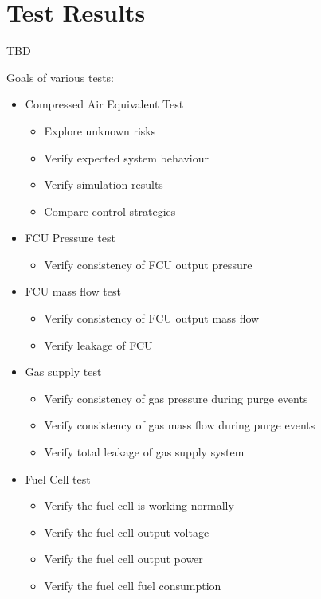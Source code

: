 \chapter{Test Results}%
\label{chap:testing}
TBD
\newpage




Goals of various tests:
\begin{itemize}
    \item Compressed Air Equivalent Test
          \begin{itemize}
              \item Explore unknown risks
              \item Verify expected system behaviour
              \item Verify simulation results
              \item Compare control strategies
          \end{itemize}

    \item FCU Pressure test
          \begin{itemize}
              \item Verify consistency of FCU output pressure
          \end{itemize}

    \item FCU mass flow test
          \begin{itemize}
              \item Verify consistency of FCU output mass flow
              \item Verify leakage of FCU
          \end{itemize}

    \item Gas supply test
          \begin{itemize}
              \item Verify consistency of gas pressure during purge events
              \item Verify consistency of gas mass flow during purge events
              \item Verify total leakage of gas supply system
          \end{itemize}

    \item Fuel Cell test
          \begin{itemize}
              \item Verify the fuel cell is working normally
              \item Verify the fuel cell output voltage
              \item Verify the fuel cell output power
              \item Verify the fuel cell fuel consumption
          \end{itemize}


\end{itemize}
